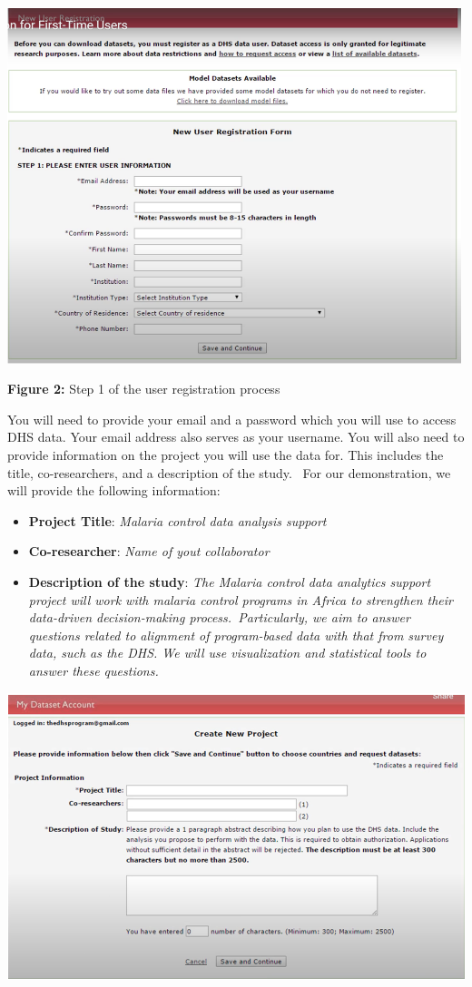 \documentclass[
  letterpaper,
  DIV=11,
  numbers=noendperiod]{scrreprt}
\begin{document}
\includegraphics[width=5.20833in,height=\textheight,keepaspectratio]{plots/image_03.png}\hfill

\textbf{Figure 2:} Step 1 of the user registration process

You will need to provide your email and a password which you will use to
access DHS data. Your email address also serves as your username. You
will also need to provide information on the project you will use the
data for. This includes the title, co-researchers, and a description of
the study.~ For our demonstration, we will provide the following
information:

\begin{itemize}
\item
  \textbf{Project Title}: \emph{Malaria control data analysis support}
\item
  \textbf{Co-researcher}: \emph{Name of yout collaborator}
\item
  \textbf{Description of the study}: \emph{The Malaria control data
  analytics support project will work with malaria control programs in
  Africa to strengthen their data-driven decision-making
  process.~Particularly, we aim to answer questions related to alignment
  of program-based data with that from survey data, such as the DHS. We
  will use visualization and statistical tools to answer these
  questions.}
\end{itemize}

\includegraphics[width=5.41667in,height=\textheight,keepaspectratio]{plots/image_04.png}\hfill
\end{document}
